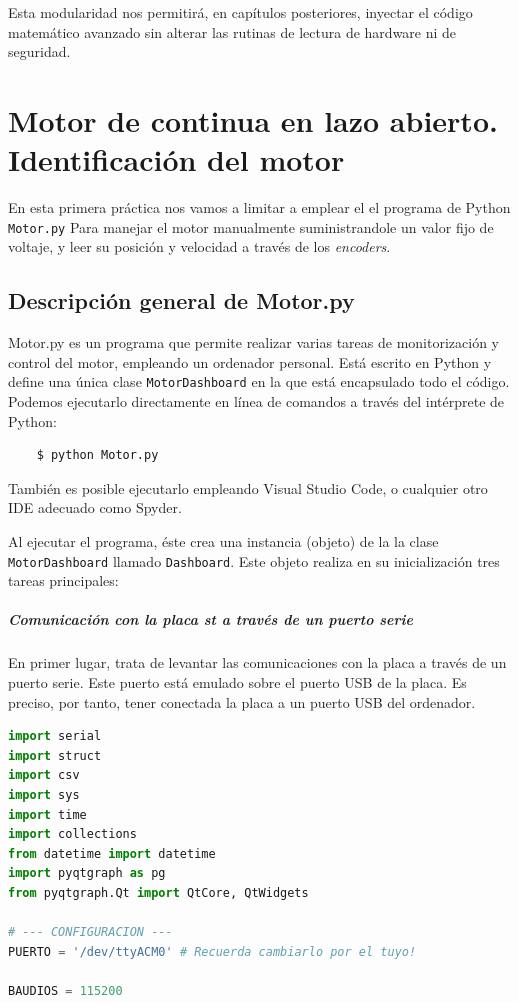 \documentclass[10pt,a4paper]{report}
\begin{document}
Esta modularidad nos permitirá, en capítulos posteriores, inyectar el código matemático avanzado sin alterar las rutinas de lectura de hardware ni de seguridad.
\chapter{Motor de continua en lazo abierto. Identificación del motor}
En esta primera práctica nos vamos a limitar a emplear el el programa de Python \texttt{Motor.py}  Para manejar el motor manualmente suministrandole un valor fijo de voltaje, y leer su posición y velocidad a través de los \emph{encoders}.
\section{Descripción general de Motor.py}
Motor.py es un programa que permite realizar varias tareas de monitorización y control del motor, empleando un ordenador personal. Está escrito en Python y define una única clase \texttt{MotorDashboard} en la que está encapsulado todo el código. Podemos ejecutarlo directamente en línea de comandos a través del intérprete de Python:
\begin{verbatim}
	$ python Motor.py
\end{verbatim}

También es posible ejecutarlo empleando Visual Studio Code, o cualquier otro IDE adecuado como Spyder.

Al ejecutar el programa, éste crea una instancia (objeto) de la la clase \texttt{MotorDashboard} llamado \texttt{Dashboard}. Este objeto realiza en su inicialización tres tareas principales:

\paragraph{Comunicación con la placa st a través de un puerto serie} 
En primer lugar, trata de levantar las comunicaciones con la placa a través de un puerto serie. Este puerto está emulado sobre el puerto USB de la placa. Es preciso, por tanto, tener conectada la placa a un puerto USB del ordenador.

\begin{lstlisting}[language=python, caption=Cabecera y primeras líneas de (\texttt{Motor.h})]
import serial
import struct
import csv
import sys
import time
import collections
from datetime import datetime
import pyqtgraph as pg
from pyqtgraph.Qt import QtCore, QtWidgets

# --- CONFIGURACION ---
PUERTO = '/dev/ttyACM0' # Recuerda cambiarlo por el tuyo! 

BAUDIOS = 115200

\end{lstlisting}\label{Motor1}
\end{document}
